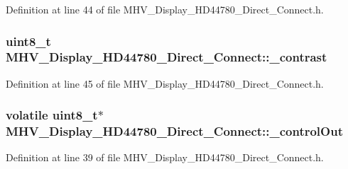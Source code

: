 \-Definition at line 44 of file \-M\-H\-V\-\_\-\-Display\-\_\-\-H\-D44780\-\_\-\-Direct\-\_\-\-Connect.\-h.

\hypertarget{class_m_h_v___display___h_d44780___direct___connect_ae7c1f3a285e1ed271227fb68a5f83c38}{
\subsubsection[{\-\_\-contrast}]{\setlength{\rightskip}{0pt plus 5cm}uint8\-\_\-t {\bf \-M\-H\-V\-\_\-\-Display\-\_\-\-H\-D44780\-\_\-\-Direct\-\_\-\-Connect\-::\-\_\-contrast}}}
\label{class_m_h_v___display___h_d44780___direct___connect_ae7c1f3a285e1ed271227fb68a5f83c38}


\-Definition at line 45 of file \-M\-H\-V\-\_\-\-Display\-\_\-\-H\-D44780\-\_\-\-Direct\-\_\-\-Connect.\-h.

\hypertarget{class_m_h_v___display___h_d44780___direct___connect_a3d308de0a3d1f48dc28ec3a0cd416373}{
\subsubsection[{\-\_\-control\-Out}]{\setlength{\rightskip}{0pt plus 5cm}volatile uint8\-\_\-t$\ast$ {\bf \-M\-H\-V\-\_\-\-Display\-\_\-\-H\-D44780\-\_\-\-Direct\-\_\-\-Connect\-::\-\_\-control\-Out}}}
\label{class_m_h_v___display___h_d44780___direct___connect_a3d308de0a3d1f48dc28ec3a0cd416373}


\-Definition at line 39 of file \-M\-H\-V\-\_\-\-Display\-\_\-\-H\-D44780\-\_\-\-Direct\-\_\-\-Connect.\-h.

